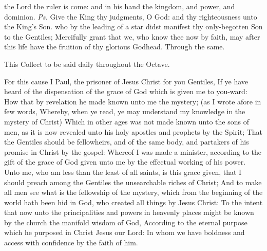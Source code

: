 \introit
{} the Lord the ruler is come: and in his hand the kingdom, and power, and dominion. \textit{Ps.} Give the King thy judgments, O God: and thy righteousness unto the King's Son.
\collect\label{EpiphanyMassCollect}
 who by the leading of a star didst manifest thy only-begotten Son to the Gentiles; Mercifully grant that we, who know thee now by faith, may after this life have the fruition of thy glorious Godhead. Through the same.
\begin{rubric}
    This Collect to be said daily throughout the Octave.
\end{rubric}
 For this cause I Paul, the prisoner of Jesus Christ for you Gentiles, If ye have heard of the dispensation of the grace of God which is given me to you-ward: How that by revelation he made known unto me the mystery; (as I wrote afore in few words, Whereby, when ye read, ye may understand my knowledge in the mystery of Christ) Which in other ages was not made known unto the sons of men, as it is now revealed unto his holy apostles and prophets by the Spirit; That the Gentiles should be fellowheirs, and of the same body, and partakers of his promise in Christ by the gospel: Whereof I was made a minister, according to the gift of the grace of God given unto me by the effectual working of his power. Unto me, who am less than the least of all saints, is this grace given, that I should preach among the Gentiles the unsearchable riches of Christ; And to make all men see what is the fellowship of the mystery, which from the beginning of the world hath been hid in God, who created all things by Jesus Christ: To the intent that now unto the principalities and powers in heavenly places might be known by the church the manifold wisdom of God, According to the eternal purpose which he purposed in Christ Jesus our Lord: In whom we have boldness and access with confidence by the faith of him.


